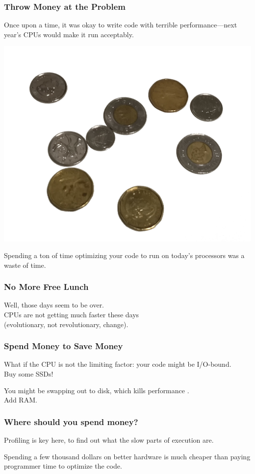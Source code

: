 \begin{frame}
\frametitle{Throw Money at the Problem}

\Large
Once upon a time, it was okay to write code with terrible performance---next year's CPUs would make it run acceptably. 

\begin{center}
\includegraphics[width=.45\textwidth]{images/L01-money.png}
\end{center}
Spending a ton of time optimizing your code to run on today's processors was a waste of time. 

\end{frame}

\begin{frame}
\frametitle{No More Free Lunch}
\Large

Well, those days seem to be over.\\
CPUs are not getting much faster these days \\
(evolutionary, not revolutionary, change). 

\end{frame}



\begin{frame}
\frametitle{Spend Money to Save Money}

\Large
What if the CPU is not the limiting factor: your code might be I/O-bound.\\
\quad Buy some SSDs! 

You might be swapping out to disk, which kills performance .\\
\quad Add RAM. 
\end{frame}

\begin{frame}
\frametitle{Where should you spend money?}
\Large

Profiling is key here, to find out what the slow parts of execution are. 

Spending a few thousand dollars on better hardware is much cheaper than paying programmer time to optimize the code.


\end{frame}





